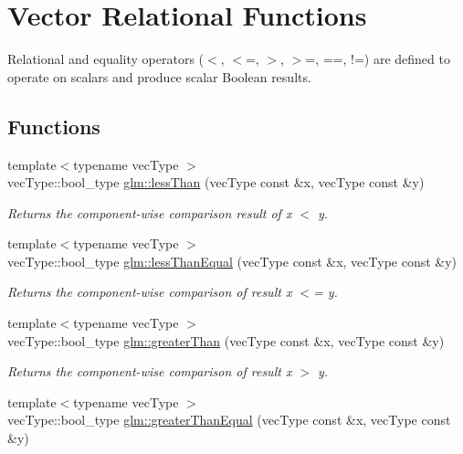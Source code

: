 \hypertarget{group__core__func__vector__relational}{\section{Vector Relational Functions}
\label{group__core__func__vector__relational}
}


Relational and equality operators ($<$, $<$=, $>$, $>$=, ==, !=) are defined to operate on scalars and produce scalar Boolean results.  


\subsection*{Functions}
\begin{DoxyCompactItemize}
\item 
{\footnotesize template$<$typename vec\-Type $>$ }\\vec\-Type\-::bool\-\_\-type \hyperlink{group__core__func__vector__relational_ga1227d6a9d2c15a57d8189c5d9f4d9c53}{glm\-::less\-Than} (vec\-Type const \&x, vec\-Type const \&y)
\begin{DoxyCompactList}\small\item\em Returns the component-\/wise comparison result of x $<$ y. \end{DoxyCompactList}\item 
{\footnotesize template$<$typename vec\-Type $>$ }\\vec\-Type\-::bool\-\_\-type \hyperlink{group__core__func__vector__relational_ga6199b9a55616b7b872b0bf0658b239ce}{glm\-::less\-Than\-Equal} (vec\-Type const \&x, vec\-Type const \&y)
\begin{DoxyCompactList}\small\item\em Returns the component-\/wise comparison of result x $<$= y. \end{DoxyCompactList}\item 
{\footnotesize template$<$typename vec\-Type $>$ }\\vec\-Type\-::bool\-\_\-type \hyperlink{group__core__func__vector__relational_gabd72ae0dc35908eaa143568fb42c3830}{glm\-::greater\-Than} (vec\-Type const \&x, vec\-Type const \&y)
\begin{DoxyCompactList}\small\item\em Returns the component-\/wise comparison of result x $>$ y. \end{DoxyCompactList}\item 
{\footnotesize template$<$typename vec\-Type $>$ }\\vec\-Type\-::bool\-\_\-type \hyperlink{group__core__func__vector__relational_gac9b3c898e70adc1e573300b1a8e66e9f}{glm\-::greater\-Than\-Equal} (vec\-Type const \&x, vec\-Type const \&y)

\end{DoxyCompactItemize}
